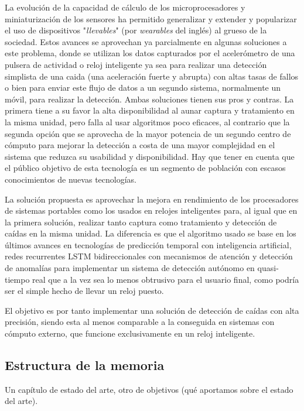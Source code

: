 \documentclass[../tfm.tex]{subfiles}
\begin{document}
La evolución de la capacidad de cálculo de los microprocesadores y miniaturización de los sensores ha permitido generalizar y extender y popularizar el uso de dispositivos "\textit{llevables}" (por \textit{wearables} del inglés) al grueso de la sociedad. Estos avances se aprovechan ya parcialmente en algunas soluciones a este problema, donde se utilizan los datos capturados por el acelerómetro de una pulsera de actividad o reloj inteligente ya sea para realizar una detección simplista de una caida (una aceleración fuerte y abrupta) con altas tasas de fallos o bien para enviar este flujo de datos a un segundo sistema, normalmente un móvil, para realizar la detección. Ambas soluciones tienen sus pros y contras. La primera tiene a su favor la alta disponibilidad al aunar captura y tratamiento en la misma unidad, pero falla al usar algoritmos poco eficaces, al contrario que la segunda opción que se aprovecha de la mayor potencia de un segundo centro de cómputo para mejorar la detección a costa de una mayor complejidad en el sistema que reduzca su usabilidad y disponibilidad. Hay que tener en cuenta que el público objetivo de esta tecnología es un segmento de población con escasos conocimientos de nuevas tecnologías.

La solución propuesta es aprovechar la mejora en rendimiento de los procesadores de sistemas portables como los usados en relojes inteligentes para, al igual que en la primera solución, realizar tanto captura como tratamiento y detección de caídas en la misma unidad. La diferencia es que el algoritmo usado se base en los últimos avances en tecnologías de predicción temporal con inteligencia artificial, redes recurrentes LSTM bidireccionales con mecanismos de atención y detección de anomalías para implementar un sistema de detección autónomo en quasi-tiempo real que a la vez sea lo menos obtrusivo para el usuario final, como podría ser el simple hecho de llevar un reloj puesto.

El objetivo es por tanto implementar una solución de detección de caídas con alta precisión, siendo esta al menos comparable a la conseguida en sistemas con cómputo externo, que funcione exclusivamente en un reloj inteligente.


\subsection{Estructura de la memoria}
Un capítulo de estado del arte, otro de objetivos (qué aportamos sobre el estado del arte).
\end{document}
